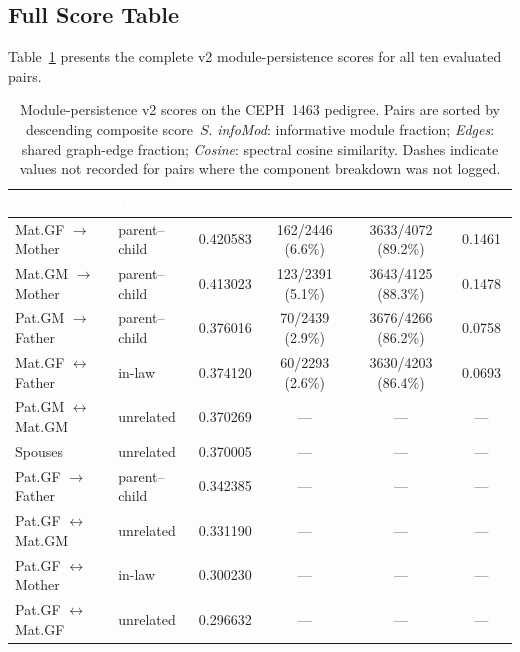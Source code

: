 \documentclass{../yalumba}
\begin{document}
\subsection{Full Score Table}

Table~\ref{tab:scores} presents the complete v2 module-persistence scores for
all ten evaluated pairs.

\begin{table}[htbp]
\centering
\tablestyle
\caption{Module-persistence v2 scores on the CEPH~1463 pedigree.
  Pairs are sorted by descending composite score~$S$.
  \emph{infoMod}: informative module fraction;
  \emph{Edges}: shared graph-edge fraction;
  \emph{Cosine}: spectral cosine similarity.
  Dashes indicate values not recorded for pairs where the
  component breakdown was not logged.}
\label{tab:scores}
\begin{tabular}{@{}llcccc@{}}
\toprule
\rowcolor{table-header}
\textcolor{white}{\textbf{Pair}} &
\textcolor{white}{\textbf{Relation}} &
\textcolor{white}{\textbf{Score}} &
\textcolor{white}{\textbf{infoMod}} &
\textcolor{white}{\textbf{Edges}} &
\textcolor{white}{\textbf{Cosine}} \\
\midrule
Mat.GF $\to$ Mother    & parent--child & 0.420583 & 162/2446 (6.6\%) & 3633/4072 (89.2\%) & 0.1461 \\
Mat.GM $\to$ Mother    & parent--child & 0.413023 & 123/2391 (5.1\%) & 3643/4125 (88.3\%) & 0.1478 \\
Pat.GM $\to$ Father    & parent--child & 0.376016 & 70/2439 (2.9\%)  & 3676/4266 (86.2\%) & 0.0758 \\
Mat.GF $\leftrightarrow$ Father  & in-law    & 0.374120 & 60/2293 (2.6\%)  & 3630/4203 (86.4\%) & 0.0693 \\
Pat.GM $\leftrightarrow$ Mat.GM  & unrelated & 0.370269 & ---   & ---    & ---    \\
Spouses                          & unrelated & 0.370005 & ---   & ---    & ---    \\
Pat.GF $\to$ Father    & parent--child & 0.342385 & ---   & ---    & ---    \\
Pat.GF $\leftrightarrow$ Mat.GM  & unrelated & 0.331190 & ---   & ---    & ---    \\
Pat.GF $\leftrightarrow$ Mother  & in-law    & 0.300230 & ---   & ---    & ---    \\
Pat.GF $\leftrightarrow$ Mat.GF  & unrelated & 0.296632 & ---   & ---    & ---    \\
\bottomrule
\end{tabular}
\end{table}
\end{document}

